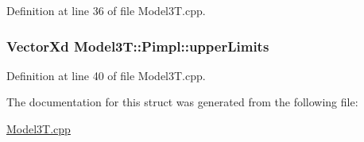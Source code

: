 Definition at line 36 of file Model3\+T.\+cpp.

\subsubsection[{\texorpdfstring{upper\+Limits}{upperLimits}}]{\setlength{\rightskip}{0pt plus 5cm}Vector\+Xd Model3\+T\+::\+Pimpl\+::upper\+Limits}\hypertarget{structModel3T_1_1Pimpl_a3b3b41e690971ea00156bdfefb813a5c}{}\label{structModel3T_1_1Pimpl_a3b3b41e690971ea00156bdfefb813a5c}


Definition at line 40 of file Model3\+T.\+cpp.



The documentation for this struct was generated from the following file\+:\begin{DoxyCompactItemize}
\item 
\hyperlink{Model3T_8cpp}{Model3\+T.\+cpp}\end{DoxyCompactItemize}
